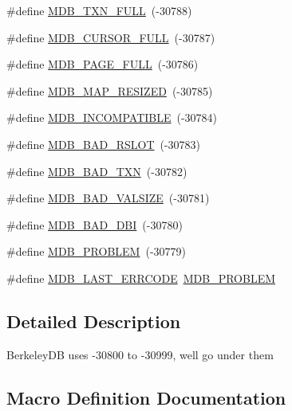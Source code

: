 \begin{DoxyCompactItemize}
\item 
\#define \mbox{\hyperlink{group__errors_gacba5cdc8618093f59d0339e88e69570e}{M\+D\+B\+\_\+\+T\+X\+N\+\_\+\+F\+U\+LL}}~(-\/30788)
\item 
\#define \mbox{\hyperlink{group__errors_gae1e5002c56df52ded874bb3495e2a733}{M\+D\+B\+\_\+\+C\+U\+R\+S\+O\+R\+\_\+\+F\+U\+LL}}~(-\/30787)
\item 
\#define \mbox{\hyperlink{group__errors_ga0501aacf4483f755c7bdcdba643b028e}{M\+D\+B\+\_\+\+P\+A\+G\+E\+\_\+\+F\+U\+LL}}~(-\/30786)
\item 
\#define \mbox{\hyperlink{group__errors_ga75c014faa4f02ffd234a5ee0e14baa92}{M\+D\+B\+\_\+\+M\+A\+P\+\_\+\+R\+E\+S\+I\+Z\+ED}}~(-\/30785)
\item 
\#define \mbox{\hyperlink{group__errors_gaa39c88fa25b3163b643198f0572a3bee}{M\+D\+B\+\_\+\+I\+N\+C\+O\+M\+P\+A\+T\+I\+B\+LE}}~(-\/30784)
\item 
\#define \mbox{\hyperlink{group__errors_ga1b6cbb28da30e28c48c9df66dd398bf0}{M\+D\+B\+\_\+\+B\+A\+D\+\_\+\+R\+S\+L\+OT}}~(-\/30783)
\item 
\#define \mbox{\hyperlink{group__errors_gadcc86b34304f2ae761e3ba7c2eb88ba9}{M\+D\+B\+\_\+\+B\+A\+D\+\_\+\+T\+XN}}~(-\/30782)
\item 
\#define \mbox{\hyperlink{group__errors_ga4630697cffb88ca6dc92504271941d0b}{M\+D\+B\+\_\+\+B\+A\+D\+\_\+\+V\+A\+L\+S\+I\+ZE}}~(-\/30781)
\item 
\#define \mbox{\hyperlink{group__errors_gab4c82e050391b60a18a5df08d22a7083}{M\+D\+B\+\_\+\+B\+A\+D\+\_\+\+D\+BI}}~(-\/30780)
\item 
\#define \mbox{\hyperlink{group__errors_gad6e68438cf673fecdf31bde35f996f99}{M\+D\+B\+\_\+\+P\+R\+O\+B\+L\+EM}}~(-\/30779)
\item 
\#define \mbox{\hyperlink{group__errors_ga4577d36100db836719f5c304a1fb5cc6}{M\+D\+B\+\_\+\+L\+A\+S\+T\+\_\+\+E\+R\+R\+C\+O\+DE}}~\mbox{\hyperlink{group__errors_gad6e68438cf673fecdf31bde35f996f99}{M\+D\+B\+\_\+\+P\+R\+O\+B\+L\+EM}}
\end{DoxyCompactItemize}


\subsection{Detailed Description}
Berkeley\+DB uses -\/30800 to -\/30999, we\textquotesingle{}ll go under them 

\subsection{Macro Definition Documentation}
\mbox{\label{group__errors_gab4c82e050391b60a18a5df08d22a7083}} 
